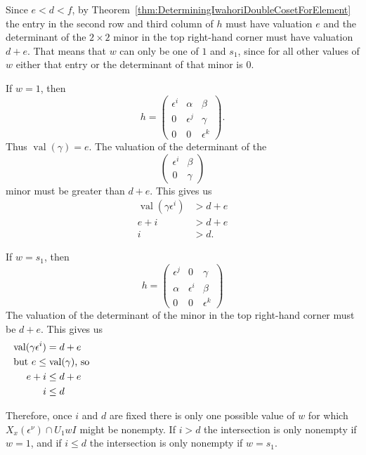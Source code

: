 \documentclass{amsart}
\theoremstyle{definition}
\def\e{\epsilon}
\def\val{\mathop{\mathrm{val}}}
\def\en{\e^{\nu}}
\def\X{X_x(\en)}
\begin{document}
  Since $e < d < f$, by
  Theorem~\ref{thm:DeterminingIwahoriDoubleCosetForElement} the entry in the
  second row and third column of $h$ must have valuation $e$ and the
  determinant of the $2 \times 2$ minor in the top right-hand corner must have
  valuation $d + e$.  That means that $w$ can only be one of $1$ and $s_1$,
  since for all other values of $w$ either that entry or the determinant of
  that minor is 0.

  If $w = 1$, then
  \begin{equation*}
    h = \begin{pmatrix}
      \e^i & \alpha & \beta \\
      0 & \e^j & \gamma \\
      0 & 0 & \e^k
    \end{pmatrix}.
  \end{equation*}
  Thus $\val(\gamma) = e$.  The valuation of the determinant of the
  \begin{equation*}
    \begin{pmatrix} \e^i & \beta \\ 0 & \gamma \end{pmatrix} \end{equation*}
  minor must be greater than $d + e$.  This gives us
  \begin{align*}
    \val(\gamma\e^i) & > d + e \\
    e + i &> d + e \\
    i & > d.
  \end{align*}

  If $w = s_1$, then
  \begin{equation*}
    h = \begin{pmatrix}
      \e^j & 0 & \gamma \\
      \alpha & \e^i & \beta \\
      0 & 0 & \e^k
    \end{pmatrix}
  \end{equation*}
  The valuation of the determinant of the minor in the top right-hand corner
  must be $d + e$.  This gives us
  \begin{align*}
    \val(\gamma\e^i) &=  d + e  \\
    \noalign{\noindent but $e \le\val(\gamma)$, so}
    e+ i &\le d +e \\
    i &\le d
  \end{align*}
  
  Therefore, once $i$ and $d$ are fixed there is only one possible value of $w$
  for which $\X \cap U_1 w I$ might be nonempty.  If $i > d$ the intersection
  is only nonempty if $w = 1$, and if $i \le d$ the intersection is only
  nonempty if $w = s_1$.
\end{document}
